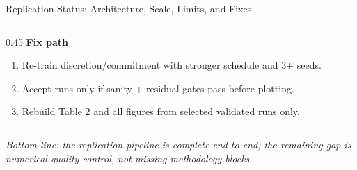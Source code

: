 \documentclass[aspectratio=169]{beamer}
\begin{document}
\begin{frame}{Replication Status: Architecture, Scale, Limits, and Fixes}
\begin{columns}[T,totalwidth=\textwidth]
\begin{column}{0.45\textwidth}
\textbf{Fix path}
\begin{enumerate}
  \item Re-train discretion/commitment with stronger schedule and 3+ seeds.
  \item Accept runs only if sanity + residual gates pass before plotting.
  \item Rebuild Table 2 and all figures from selected validated runs only.
\end{enumerate}
\end{column}
\end{columns}
\vspace{0.3em}
\scriptsize \textit{Bottom line: the replication pipeline is complete end-to-end; the remaining gap is numerical quality control, not missing methodology blocks.}
\end{frame}
\end{document}
